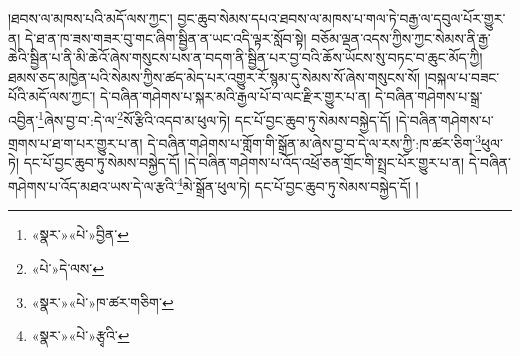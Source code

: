 །ཐབས་ལ་མཁས་པའི་མདོ་ལས་ཀྱང་། བྱང་ཆུབ་སེམས་དཔའ་ཐབས་ལ་མཁས་པ་གལ་ཏེ་བརྒྱ་ལ་དབུལ་པོར་གྱུར་ན། དེ་ཐ་ན་ཁ་ཟས་གཟར་བུ་གང་ཞིག་སྦྱིན་ན་ཡང་འདི་ལྟར་སློབ་སྟེ། བཅོམ་ལྡན་འདས་ཀྱིས་ཀྱང་སེམས་ནི་རྒྱ་ཆེའི་སྦྱིན་པ་ནི་མི་ཆེའོ་ཞེས་གསུངས་པས་ན་བདག་ནི་སྦྱིན་པར་བྱ་བའི་ཆོས་ཡོངས་སུ་བཏང་བ་ཆུང་མོད་ཀྱི། ཐམས་ཅད་མཁྱེན་པའི་སེམས་ཀྱིས་ཚད་མེད་པར་འགྱུར་རོ་སྙམ་དུ་སེམས་སོ་ཞེས་གསུངས་སོ། །བསྐལ་པ་བཟང་པོའི་མདོ་ལས་ཀྱང་། དེ་བཞིན་གཤེགས་པ་སྐར་མའི་རྒྱལ་པོ་བ་ལང་རྫིར་གྱུར་པ་ན། དེ་བཞིན་གཤེགས་པ་སྒྲ་འབྱིན་\footnote{«སྣར་»«པེ་»བྱིན་}ཞེས་བྱ་བ་:དེ་ལ་\footnote{«པེ་»དེ་ལས་}སོ་རྩིའི་འདབ་མ་ཕུལ་ཏེ། དང་པོ་བྱང་ཆུབ་ཏུ་སེམས་བསྐྱེད་དོ། །དེ་བཞིན་གཤེགས་པ་གྲགས་པ་ཐ་ག་པར་གྱུར་པ་ན། དེ་བཞིན་གཤེགས་པ་གློག་གི་སྒྲོན་མ་ཞེས་བྱ་བ་དེ་ལ་རས་ཀྱི་:ཁ་ཚར་ཅིག་\footnote{«སྣར་»«པེ་»ཁ་ཚར་གཅིག་}ཕུལ་ཏེ། དང་པོ་བྱང་ཆུབ་ཏུ་སེམས་བསྐྱེད་དོ། །དེ་བཞིན་གཤེགས་པ་འོད་འཕྲོ་ཅན་གྲོང་གི་སྤྲང་པོར་གྱུར་པ་ན། དེ་བཞིན་གཤེགས་པ་འོད་མཐའ་ཡས་དེ་ལ་རྩའི་\footnote{«སྣར་»«པེ་»རྩྭའི་}མེ་སྒྲོན་ཕུལ་ཏེ། དང་པོ་བྱང་ཆུབ་ཏུ་སེམས་བསྐྱེད་དོ། །
